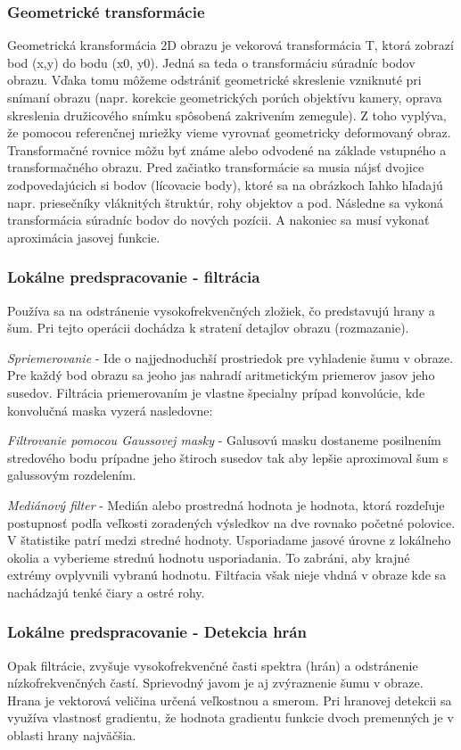 \subsubsection{Geometrické transformácie}
Geometrická kransformácia 2D obrazu je vekorová transformácia T, ktorá zobrazí bod (x,y) do bodu (x0, y0).  Jedná sa teda o transformáciu súradníc bodov obrazu. Vďaka tomu môžeme odstrániť geometrické skreslenie vzniknuté pri snímaní obrazu (napr. korekcie geometrických porúch objektívu kamery, oprava skreslenia družicového snímku spôsobená zakrivením zemegule).  Z toho vyplýva, že pomocou referenčnej mriežky vieme vyrovnať geometricky deformovaný obraz. Transformačné rovnice môžu byť známe alebo odvodené na základe vstupného a transformačného  obrazu. Pred začiatko transformácie sa musia nájsť dvojice zodpovedajúcich si bodov (lícovacie body), ktoré sa na obrázkoch ľahko hľadajú napr. priesečníky vláknitých štruktúr, rohy objektov a pod. Následne sa vykoná transformácia súradníc bodov do nových pozícii. A nakoniec sa musí vykonať aproximácia jasovej funkcie.

\subsubsection{Lokálne predspracovanie - filtrácia}
Používa sa na odstránenie vysokofrekvenčných zložiek, čo predstavujú hrany a šum. Pri tejto operácii dochádza k stratení detajlov obrazu (rozmazanie).

\textit{Spriemerovanie} - Ide o najjednoduchší prostriedok pre vyhladenie šumu v obraze. Pre každý bod obrazu sa jeoho jas nahradí aritmetickým priemerov jasov jeho susedov. Filtrácia priemerovaním je vlastne špecialny prípad konvolúcie, kde konvolučná maska vyzerá nasledovne:


\textit{Filtrovanie pomocou Gaussovej masky} - Galusovú masku dostaneme posilnením stredového bodu prípadne jeho štiroch susedov tak aby lepšie aproximoval šum s galussovým rozdelením.


\textit{Mediánový filter} - Medián alebo prostredná hodnota je hodnota, ktorá rozdeľuje postupnosť podľa veľkosti zoradených výsledkov na dve rovnako početné polovice. V štatistike patrí medzi stredné hodnoty. Usporiadame jasové úrovne z lokálneho okolia a vyberieme strednú hodnotu usporiadania. To zabráni, aby krajné extrémy ovplyvnili vybranú hodnotu. Filtŕacia však nieje vhdná v obraze kde sa nachádzajú tenké čiary a ostré rohy. 


\subsubsection{Lokálne predspracovanie - Detekcia hrán}
Opak filtrácie, zvyšuje vysokofrekvenčné časti spektra (hrán) a odstránenie nízkofrekvenčných častí. Sprievodný javom je aj zvýraznenie šumu v obraze.  Hrana je vektorová veličina určená veľkostnou a smerom. Pri hranovej detekcii sa využíva vlastnosť gradientu, že hodnota gradientu funkcie dvoch premenných je v oblasti hrany najväčšia. 

